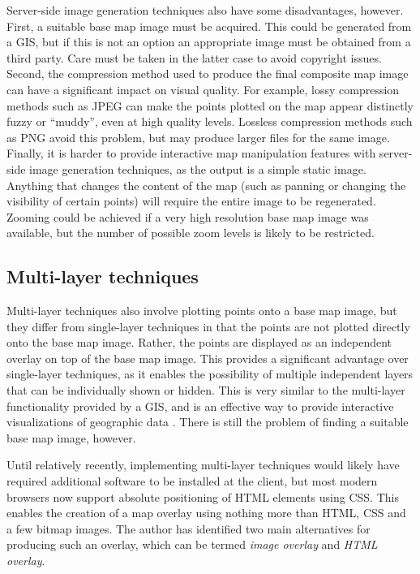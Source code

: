 \documentclass[acmnow]{acmtrans2m}
\begin{document}
Server-side image generation techniques also have some disadvantages,
however. First, a suitable base map image must be acquired. This could
be generated from a GIS, but if this is not an option an appropriate
image must be obtained from a third party. Care must be taken in the
latter case to avoid copyright issues. Second, the compression method
used to produce the final composite map image can have a significant
impact on visual quality. For example, lossy compression methods such as
JPEG can make the points plotted on the map appear distinctly fuzzy or
``muddy'', even at high quality levels. Lossless compression methods
such as PNG avoid this problem, but may produce larger files for the
same image. Finally, it is harder to provide interactive map
manipulation features with server-side image generation techniques, as
the output is a simple static image. Anything that changes the content
of the map (such as panning or changing the visibility of certain
points) will require the entire image to be regenerated. Zooming could
be achieved if a very high resolution base map image was available, but
the number of possible zoom levels is likely to be restricted.


\subsection{Multi-layer techniques}
\label{sec-overlay}

Multi-layer techniques also involve plotting points onto a base map
image, but they differ from single-layer techniques in that the points
are not plotted directly onto the base map image. Rather, the points are
displayed as an independent overlay on top of the base map image. This
provides a significant advantage over single-layer techniques, as it
enables the possibility of multiple independent layers that can be
individually shown or hidden. This is very similar to the multi-layer
functionality provided by a GIS, and is an effective way to provide
interactive visualizations of geographic data
\cite{Wood-J-1996-vis,MacE-AM-1998-GIS}. There is still the problem of
finding a suitable base map image, however.

Until relatively recently, implementing multi-layer techniques would
likely have required additional software to be installed at the client,
but most modern browsers now support absolute positioning of HTML elements
using CSS. This enables the creation of a map overlay using nothing more
than HTML, CSS and a few bitmap images. The author has identified two
main alternatives for producing such an overlay, which can be termed
\emph{image overlay} and \emph{HTML overlay}.
\end{document}
